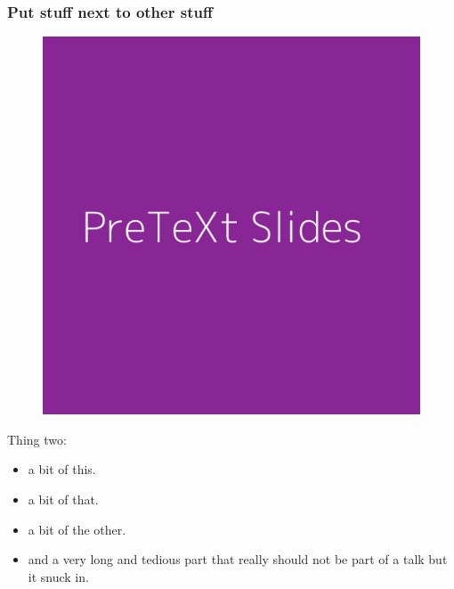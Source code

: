 \documentclass[11pt, compress]{beamer}
\begin{document}
\begin{frame}
\frametitle{Put stuff next to other stuff}
 \begin{tcbraster}[arc=0pt, raster columns=2, raster equal height=rows, raster force size=false, raster column skip=0ex] 
\begin{tcolorbox}[valign=top, width=0.5\textwidth]

\begin{figure}\centering\includegraphics[width=1\linewidth]{img/500-872694.png}
\end{figure}\end{tcolorbox}
 \begin{tcolorbox}[valign=top, width=0.5\textwidth]

Thing two: \begin{itemize}
\item{}
a bit of this.

\item{}
a bit of that.

\item{}
a bit of the other.

\item{}
and a very long and tedious part that really should not be part of a talk but it snuck in.
\end{itemize}\end{tcolorbox}
 \end{tcbraster} 
\end{frame}
 
\end{document}
